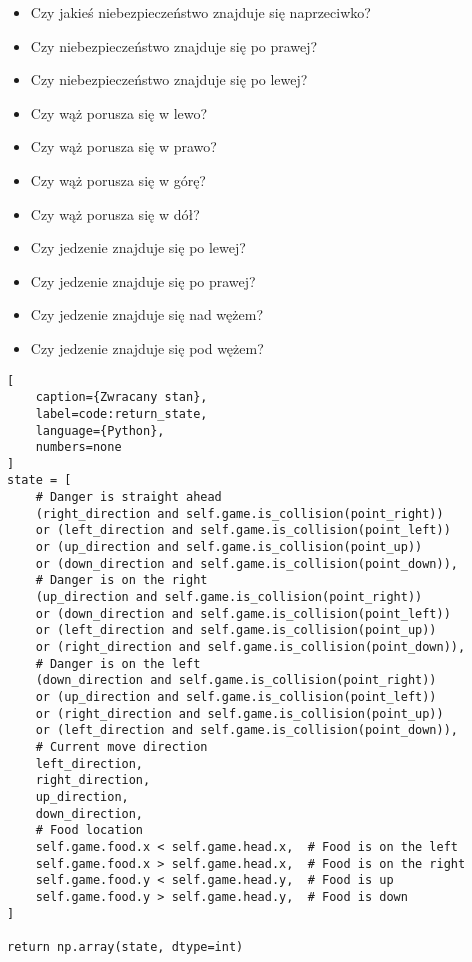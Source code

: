 \begin{itemize}
    \item Czy jakieś niebezpieczeństwo znajduje się naprzeciwko?
    \item Czy niebezpieczeństwo znajduje się po prawej?
    \item Czy niebezpieczeństwo znajduje się po lewej?
    \item Czy wąż porusza się w lewo?
    \item Czy wąż porusza się w prawo?
    \item Czy wąż porusza się w górę?
    \item Czy wąż porusza się w dół?
    \item Czy jedzenie znajduje się po lewej?
    \item Czy jedzenie znajduje się po prawej?
    \item Czy jedzenie znajduje się nad wężem?
    \item Czy jedzenie znajduje się pod wężem?
\end{itemize}


\begin{onepage}
    \begin{lstlisting}[
    caption={Zwracany stan},
    label=code:return_state,
    language={Python},
    numbers=none
]
state = [
    # Danger is straight ahead
    (right_direction and self.game.is_collision(point_right))
    or (left_direction and self.game.is_collision(point_left))
    or (up_direction and self.game.is_collision(point_up))
    or (down_direction and self.game.is_collision(point_down)),
    # Danger is on the right
    (up_direction and self.game.is_collision(point_right))
    or (down_direction and self.game.is_collision(point_left))
    or (left_direction and self.game.is_collision(point_up))
    or (right_direction and self.game.is_collision(point_down)),
    # Danger is on the left
    (down_direction and self.game.is_collision(point_right))
    or (up_direction and self.game.is_collision(point_left))
    or (right_direction and self.game.is_collision(point_up))
    or (left_direction and self.game.is_collision(point_down)),
    # Current move direction
    left_direction,
    right_direction,
    up_direction,
    down_direction,
    # Food location
    self.game.food.x < self.game.head.x,  # Food is on the left
    self.game.food.x > self.game.head.x,  # Food is on the right
    self.game.food.y < self.game.head.y,  # Food is up
    self.game.food.y > self.game.head.y,  # Food is down
]

return np.array(state, dtype=int)
    \end{lstlisting}
\end{onepage}

